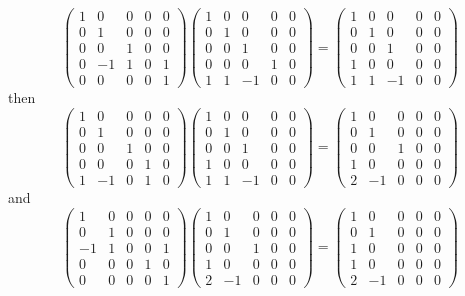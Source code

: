 \documentclass[a4paper,12pt]{article}
\begin{document}
\[
\begin{pmatrix}
1&0&0&0&0\\
0&1&0&0&0\\
0&0&1&0&0\\
0&-1&1&0&1\\
0&0&0&0&1
\end{pmatrix}
\begin{pmatrix}
1&0&0&0&0\\
0&1&0&0&0\\
0&0&1&0&0\\
0&0&0&1&0\\
1&1&-1&0&0
\end{pmatrix}
=
\begin{pmatrix}
 1&0&0&0&0\\
 0&1&0&0&0\\
 0&0&1&0&0\\
 1&0&0&0&0\\
 1&1&-1&0&0   
\end{pmatrix}
\]
then
\[
\begin{pmatrix}
1&0&0&0&0\\
0&1&0&0&0\\
0&0&1&0&0\\
0&0&0&1&0\\
1&-1&0&1&0
\end{pmatrix}
\begin{pmatrix}
 1&0&0&0&0\\
 0&1&0&0&0\\
 0&0&1&0&0\\
 1&0&0&0&0\\
 1&1&-1&0&0   
\end{pmatrix}
=
\begin{pmatrix}
1&0&0&0&0\\
0&1&0&0&0\\
0&0&1&0&0\\
1&0&0&0&0\\
2&-1&0&0&0
\end{pmatrix}
\]
and
\[
\begin{pmatrix}
 1&0&0&0&0\\
 0&1&0&0&0\\
 -1&1&0&0&1\\
 0&0&0&1&0\\
 0&0&0&0&1   
\end{pmatrix}
\begin{pmatrix}
1&0&0&0&0\\
0&1&0&0&0\\
0&0&1&0&0\\
1&0&0&0&0\\
2&-1&0&0&0
\end{pmatrix}
=
\begin{pmatrix}
 1&0&0&0&0\\
 0&1&0&0&0\\
 1&0&0&0&0\\
 1&0&0&0&0\\
 2&-1&0&0&0 
\end{pmatrix}
\]
\end{document}
